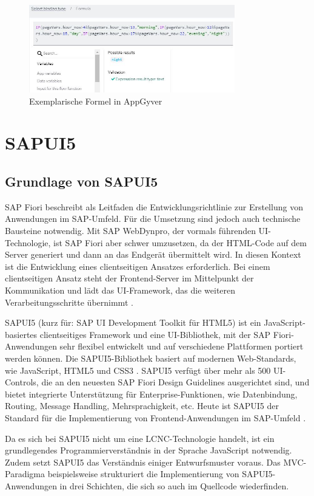 \begin{figure}[htbp]
 \centering
 \includegraphics[width=0.8\textwidth]{Bilder/appgyver/2_5_Formula.jpg}
 \caption{Exemplarische Formel in AppGyver}
\end{figure} 

\section{SAPUI5}
\subsection{Grundlage von SAPUI5}
SAP Fiori beschreibt als Leitfaden die Entwicklungsrichtlinie zur Erstellung von Anwendungen im SAP-Umfeld. Für die Umsetzung sind jedoch auch technische Bausteine notwendig. Mit SAP WebDynpro, der vormals führenden UI-Technologie, ist SAP Fiori aber schwer umzusetzen, da der HTML-Code auf dem Server generiert und dann an das Endgerät übermittelt wird. In diesen Kontext ist die Entwicklung eines clientseitigen Ansatzes erforderlich. Bei einem clientseitigen Ansatz steht der Frontend-Server im Mittelpunkt der Kommunikation und lädt das UI-Framework, das die weiteren Verarbeitungsschritte übernimmt \cite[S.45-47]{fiori}.

SAPUI5 (kurz für: SAP UI Development Toolkit für HTML5) ist ein JavaScript-basiertes clientseitiges Framework und eine UI-Bibliothek, mit der SAP Fiori-Anwendungen sehr flexibel entwickelt und auf verschiedene Plattformen portiert werden können. Die SAPUI5-Bibliothek basiert auf modernen Web-Standards, wie JavaScript, HTML5 und CSS3 \cite[S.139]{sapui5}. SAPUI5 verfügt über mehr als 500 UI-Controls, die an den neuesten SAP Fiori Design Guidelines ausgerichtet sind, und bietet integrierte Unterstützung für Enterprise-Funktionen, wie Datenbindung, Routing, Message Handling, Mehrsprachigkeit, etc. Heute ist SAPUI5 der Standard für die Implementierung von Frontend-Anwendungen im SAP-Umfeld \cite{sap:ui5}.

Da es sich bei SAPUI5 nicht um eine LCNC-Technologie handelt, ist ein grundlegendes Programmierverständnis in der Sprache JavaScript notwendig. Zudem setzt SAPUI5 das Verständnis einiger Entwurfsmuster voraus. Das MVC-Paradigma beispielsweise strukturiert die Implementierung von SAPUI5-Anwendungen in drei Schichten, die sich so auch im Quellcode wiederfinden.

